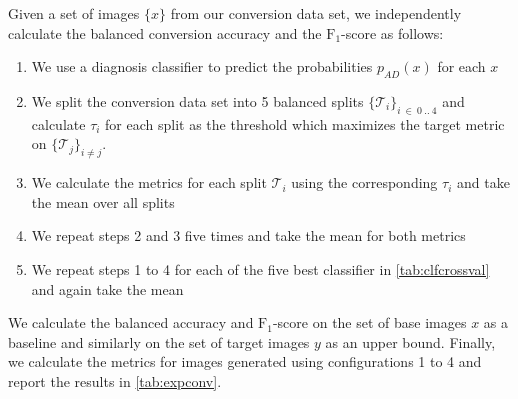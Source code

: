 Given a set of images $\{x\}$ from our conversion data set, we independently calculate the balanced conversion accuracy and the $\text{F}_1$-score as follows:
\begin{enumerate}
	\item We use a diagnosis classifier to predict the probabilities $p_{AD}(x)$ for each $x$
	\item We split the conversion data set into 5 balanced splits $\{\mathcal{T}_i\}_{i\ \in\ 0\ ..\ 4}$ and calculate $\tau_i$ for each split as the threshold which maximizes the target metric on $\{\mathcal{T}_j\}_{i \neq j}$.
	\item We calculate the metrics for each split $\mathcal{T}_i$ using the corresponding $\tau_i$ and take the mean over all splits
	\item We repeat steps 2 and 3 five times and take the mean for both metrics
	\item We repeat steps 1 to 4 for each of the five best classifier in \autoref{tab:clfcrossval} and again take the mean
\end{enumerate}

We calculate the balanced accuracy and $\text{F}_1$-score on the set of base images $x$ as a baseline and similarly on the set of target images $y$ as an upper bound. Finally, we calculate the metrics for images generated using configurations 1 to 4 and report the results in \autoref{tab:expconv}.


